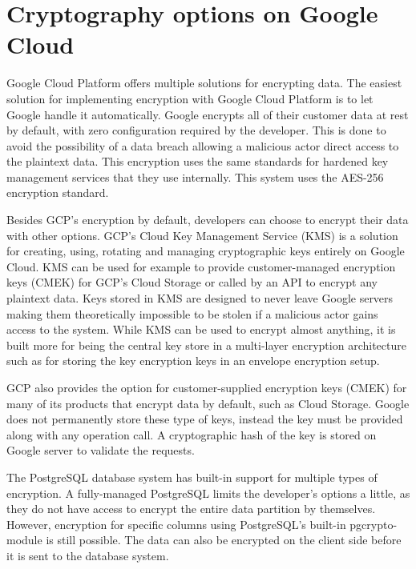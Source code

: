 \section{Cryptography options on Google Cloud}

Google Cloud Platform offers multiple solutions for encrypting data.
The easiest solution for implementing encryption with Google Cloud Platform is to let Google handle it automatically.
Google encrypts all of their customer data at rest by default, with zero configuration required by the developer.
This is done to avoid the possibility of a data breach allowing a malicious actor direct access to the plaintext data.
This encryption uses the same standards for hardened key management services that they use internally.
This system uses the AES-256 encryption standard.
\cite{googlecloud}

Besides GCP's encryption by default, developers can choose to encrypt their data with other options.
GCP's Cloud Key Management Service (KMS) is a solution for creating, using, rotating and managing cryptographic keys entirely on Google Cloud.
KMS can be used for example to provide customer-managed encryption keys (CMEK) for GCP's Cloud Storage or called by an API to encrypt any plaintext data.
Keys stored in KMS are designed to never leave Google servers making them theoretically impossible to be stolen if a malicious actor gains access to the system.
While KMS can be used to encrypt almost anything, it is built more for being the central key store in a multi-layer encryption architecture such as for storing the key encryption keys in an envelope encryption setup.
\cite{googlecloud}

GCP also provides the option for customer-supplied encryption keys (CMEK) for many of its products that encrypt data by default, such as Cloud Storage.
Google does not permanently store these type of keys, instead the key must be provided along with any operation call.
A cryptographic hash of the key is stored on Google server to validate the requests.
\cite{googlecloud}

The PostgreSQL database system has built-in support for multiple types of encryption.
A fully-managed PostgreSQL limits the developer's options a little, as they do not have access to encrypt the entire data partition by themselves.
However, encryption for specific columns using PostgreSQL's built-in pgcrypto-module is still possible.
The data can also be encrypted on the client side before it is sent to the database system.
\cite{postgresql}

